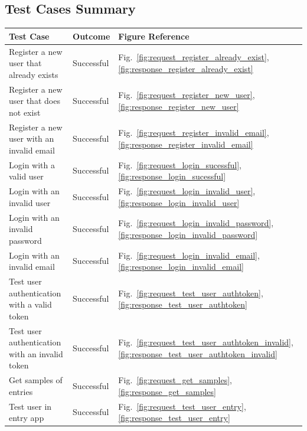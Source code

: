 \subsection{Test Cases Summary}

\begin{table}[H]
\centering
\begin{tabular}{|l|l|l|}
\hline
\textbf{Test Case}                             & \textbf{Outcome} & \textbf{Figure Reference} \\ \hline
Register a new user that already exists        & Successful      & Fig.~\ref{fig:request_register_already_exist}, \ref{fig:response_register_already_exist} \\ \hline
Register a new user that does not exist        & Successful      & Fig.~\ref{fig:request_register_new_user}, \ref{fig:response_register_new_user} \\ \hline
Register a new user with an invalid email      & Successful      & Fig.~\ref{fig:request_register_invalid_email}, \ref{fig:response_register_invalid_email} \\ \hline
Login with a valid user                        & Successful      & Fig.~\ref{fig:request_login_sucessful}, \ref{fig:response_login_sucessful} \\ \hline
Login with an invalid user                     & Successful      & Fig.~\ref{fig:request_login_invalid_user}, \ref{fig:response_login_invalid_user} \\ \hline
Login with an invalid password                 & Successful      & Fig.~\ref{fig:request_login_invalid_password}, \ref{fig:response_login_invalid_password} \\ \hline
Login with an invalid email                    & Successful      & Fig.~\ref{fig:request_login_invalid_email}, \ref{fig:response_login_invalid_email} \\ \hline
Test user authentication with a valid token    & Successful      & Fig.~\ref{fig:request_test_user_authtoken}, \ref{fig:response_test_user_authtoken} \\ \hline
Test user authentication with an invalid token & Successful      & Fig.~\ref{fig:request_test_user_authtoken_invalid}, \ref{fig:response_test_user_authtoken_invalid} \\ \hline
Get samples of entries                                   & Successful      & Fig.~\ref{fig:request_get_samples}, \ref{fig:response_get_samples} \\ \hline
Test user in entry app                         & Successful      & Fig.~\ref{fig:request_test_user_entry}, \ref{fig:response_test_user_entry} \\ \hline

\end{tabular}
\end{table}
